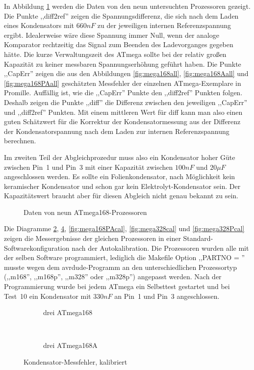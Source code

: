 In Abbildung \ref{fig:CompAdjust} werden die Daten von den neun untersuchten Prozessoren gezeigt.
Die Punkte ,,diff2ref'' zeigen die Spannungsdifferenz, die sich nach dem Laden eines Kondensators mit \(660 nF\) zu der
jeweiligen internen Referenzspannung ergibt. Idealerweise wäre diese Spannung immer Null, wenn der analoge
Komparator rechtzeitig das Signal zum Beenden des Ladevorganges gegeben hätte. Die kurze Verwaltungszeit des ATmega
sollte bei der relativ großen Kapazität zu keiner messbaren Spannungserhöhung geführt haben.
Die Punkte ,,CapErr'' zeigen die aus den Abbildungen \ref{fig:mega168all}, \ref{fig:mega168Aall} und \ref{fig:mega168PAall} 
geschätzten Messfehler der einzelnen ATmega-Exemplare in Promille.
Auffällig ist, wie die ,,CapErr'' Punkte den ,,diff2ref'' Punkten folgen.
Deshalb zeigen die Punkte ,,diff'' die Differenz zwischen den jeweiligen ,,CapErr'' und ,,diff2ref'' Punkten.
Mit einem mittleren Wert für diff kann man also einen guten Schätzwert für die Korrektur der Kondensatormessung aus der
Differenz der Kondensatorspannung nach dem Laden zur internen Referenzspannung berechnen.

Im zweiten Teil der Abgleichprozedur muss also ein Kondensator hoher Güte zwischen Pin~1 und Pin~3 mit einer
Kapazität zwischen \(100 nF\) und \(20 \mu F\) angeschlossen werden. 
Es sollte ein Folienkondensator, nach Möglichkeit kein keramischer Kondensator und schon gar kein
Elektrolyt-Kondensator sein. Der Kapazitätswert braucht aber für diesen Abgleich nicht genau bekannt zu sein.

\begin{figure}[H]
\centering

\caption{Daten von neun ATmega168-Prozessoren}
\label{fig:CompAdjust}
\end{figure}

Die Diagramme \ref{fig:mega168cal}, \ref{fig:mega168Acal}, \ref{fig:mega168PAcal},  \ref{fig:mega328cal} und
\ref{fig:mega328Pcal} zeigen die Messergebnisse
der gleichen Prozessoren in einer Standard-Softwarekonfiguration nach der Autokalibration.
Die Prozessoren wurden alle mit der selben Software programmiert, lediglich die Makefile Option ,,PARTNO = '' musste 
wegen dem avrdude-Programm an den unterschiedlichen Prozessortyp (,,m168'', ,,m168p'', ,,m328'' oder ,,m328p'') angepasst werden.
Nach der Programmierung wurde bei jedem ATmega ein
Selbsttest gestartet und bei Test~10 ein Kondensator mit \(330 nF\) an Pin~1 und Pin~3 angeschlossen.

\begin{figure}[H]
  \begin{subfigure}[b]{9cm}
    \centering
    \resizebox{9cm}{!}{}
    \caption{drei ATmega168}
    \label{fig:mega168cal}
  \end{subfigure}
  ~
  \begin{subfigure}[b]{9cm}
    \centering
    \resizebox{9cm}{!}{}
    \caption{drei ATmega168A}
    \label{fig:mega168Acal}
  \end{subfigure}
  \caption{Kondensator-Messfehler, kalibriert}
\end{figure}

